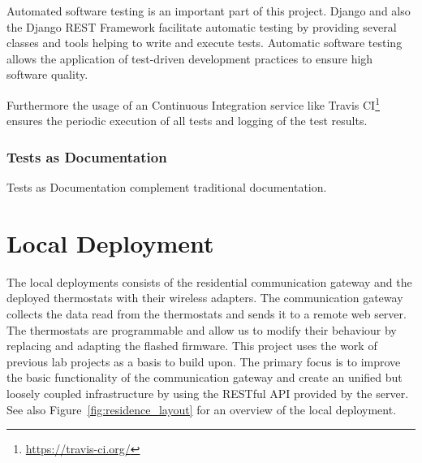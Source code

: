 Automated software testing is an important part of this project. Django and also the Django REST Framework facilitate automatic testing by providing several classes and tools helping to write and execute tests. Automatic software testing allows the application of test-driven development practices to ensure high software quality.

Furthermore the usage of an Continuous Integration service like Travis CI\footnote{\url{https://travis-ci.org/}} ensures the periodic execution of all tests and logging of the test results.

\subsubsection{Tests as Documentation}

Tests as Documentation complement traditional documentation.


\section{Local Deployment}
\label{sec:local_infrastructure}

The local deployments consists of the residential communication gateway and the deployed thermostats with their wireless adapters. The communication gateway collects the data read from the thermostats and sends it to a remote web server. The thermostats are programmable and allow us to modify their behaviour by replacing and adapting the flashed firmware. This project uses the work of previous lab projects as a basis to build upon. The primary focus is to improve the basic functionality of the communication gateway and create an unified but loosely coupled infrastructure by using the RESTful API provided by the server.
See also Figure~\ref{fig:residence_layout} for an overview of the local deployment.

